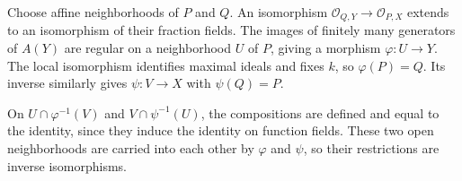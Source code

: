 Choose affine neighborhoods of $P$ and $Q$. An isomorphism $\mathcal O_{Q,Y}\to\mathcal O_{P,X}$ extends to an isomorphism of their fraction fields. The images of finitely many generators of $A(Y)$ are regular on a neighborhood $U$ of $P$, giving a morphism $\varphi:U\to Y$. The local isomorphism identifies maximal ideals and fixes $k$, so $\varphi(P)=Q$. Its inverse similarly gives $\psi:V\to X$ with $\psi(Q)=P$.

On $U\cap\varphi^{-1}(V)$ and $V\cap\psi^{-1}(U)$, the compositions are defined and equal to the identity, since they induce the identity on function fields. These two open neighborhoods are carried into each other by $\varphi$ and $\psi$, so their restrictions are inverse isomorphisms.
